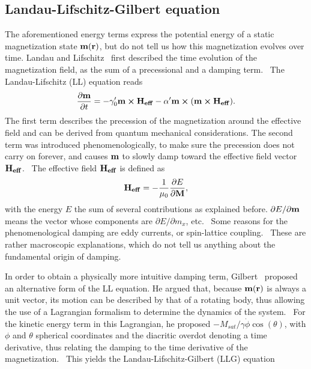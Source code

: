 \documentclass[11pt,a4paper,english]{article}
\begin{document}
\subsection{Landau-Lifschitz-Gilbert equation}
The aforementioned energy terms express the potential energy of a static magnetization state $\vb{m}(\vb{r})$, but do not tell us how this magnetization evolves over time. Landau and Lifschitz~\cite{lifdau} first described the time evolution of the magnetization field, as the sum of a precessional and a damping term.~\cite{abert2013discrete, NML_Carlton, phd_leliaert} The Landau-Lifschitz (LL) equation reads
\begin{equation}
    \frac{\partial \vb{m}}{\partial t} = - \gamma_0' \vb{m} \cross \vb{H_{eff}} - \alpha' \vb{m} \cross (\vb{m} \cross \vb{H_{eff}}) \mathrm{.}
    \label{eq:LL}
\end{equation}
The first term describes the precession of the magnetization around the effective field and can be derived from quantum mechanical considerations.  The second term was introduced phenomenologically, to make sure the precession does not carry on forever, and causes $\vb{m}$ to slowly damp toward the effective field vector $\vb{H_{eff}}$.~\cite{NML_Carlton} The effective field $\vb{H_{eff}}$ is defined as
\begin{equation}
	\vb{H_{eff}} = - \frac{1}{\mu_0} \frac{\partial E}{\partial \vb{M}} \mathrm{,}
	\label{eq:H_eff}
\end{equation}
with the energy $E$ the sum of several contributions as explained before. $\partial E/\partial \vb{m}$ means the vector whose components are $\partial E/\partial m_x$, etc.~\cite{ThermFluc_SingleDomain} Some reasons for the phenomenological damping are eddy currents, or spin-lattice coupling.~\cite{phd_leliaert} These are rather macroscopic explanations, which do not tell us anything about the fundamental origin of damping.
\par
In order to obtain a physically more intuitive damping term, Gilbert~\cite{Gilbert1955ALF} proposed an alternative form of the LL equation. He argued that, because $\vb{m}(\vb{r})$ is always a unit vector, its motion can be described by that of a rotating body, thus allowing the use of a Lagrangian formalism to determine the dynamics of the system.~\cite{abert2013discrete} For the kinetic energy term in this Lagrangian, he proposed $-M_{sat}/\gamma \dot{\phi} \cos(\theta)$, with $\phi$ and $\theta$ spherical coordinates and the diacritic overdot denoting a time derivative, thus relating the damping to the time derivative of the magnetization.~\cite{abert2013discrete} This yields the Landau-Lifschitz-Gilbert (LLG) equation~\cite{ThermFluc_SingleDomain, phd_leliaert, LEL-17b}
\end{document}
